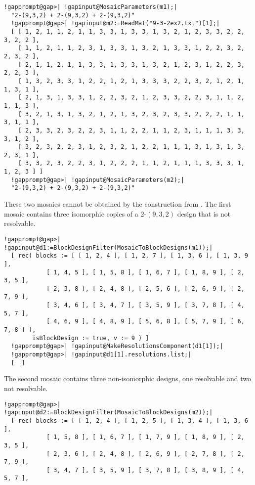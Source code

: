 \documentclass[a4paper,11pt]{report}
\begin{document}
{{\begin{Verbatim}[commandchars=!@|,fontsize=\small,frame=single,label=Example]
  !gapprompt@gap>| !gapinput@MosaicParameters(m1);|
  "2-(9,3,2) + 2-(9,3,2) + 2-(9,3,2)"
  !gapprompt@gap>| !gapinput@m2:=ReadMat("9-3-2ex2.txt")[1];|
  [ [ 1, 2, 1, 1, 2, 1, 1, 3, 3, 1, 3, 3, 1, 3, 2, 1, 2, 3, 3, 2, 2, 3, 2, 2 ], 
    [ 1, 1, 2, 1, 1, 2, 3, 1, 3, 3, 1, 3, 2, 1, 3, 3, 1, 2, 2, 3, 2, 2, 3, 2 ], 
    [ 2, 1, 1, 2, 1, 1, 3, 3, 1, 3, 3, 1, 3, 2, 1, 2, 3, 1, 2, 2, 3, 2, 2, 3 ], 
    [ 1, 3, 2, 3, 3, 1, 2, 2, 1, 2, 1, 3, 3, 3, 2, 2, 3, 2, 1, 2, 1, 1, 3, 1 ], 
    [ 2, 1, 3, 1, 3, 3, 1, 2, 2, 3, 2, 1, 2, 3, 3, 2, 2, 3, 1, 1, 2, 1, 1, 3 ], 
    [ 3, 2, 1, 3, 1, 3, 2, 1, 2, 1, 3, 2, 3, 2, 3, 3, 2, 2, 2, 1, 1, 3, 1, 1 ], 
    [ 2, 3, 3, 2, 3, 2, 2, 3, 1, 1, 2, 2, 1, 1, 2, 3, 1, 1, 1, 3, 3, 3, 1, 2 ], 
    [ 3, 2, 3, 2, 2, 3, 1, 2, 3, 2, 1, 2, 2, 1, 1, 1, 3, 1, 3, 1, 3, 2, 3, 1 ], 
    [ 3, 3, 2, 3, 2, 2, 3, 1, 2, 2, 2, 1, 1, 2, 1, 1, 1, 3, 3, 3, 1, 1, 2, 3 ] ]
  !gapprompt@gap>| !gapinput@MosaicParameters(m2);|
  "2-(9,3,2) + 2-(9,3,2) + 2-(9,3,2)"
\end{Verbatim}
 These two mosaics cannot be obtained by the construction from \cite{GGP18}. The first mosaic contains three isomorphic copies of a $2$-$(9,3,2)$ design that is not resolvable. 
\begin{Verbatim}[commandchars=!@|,fontsize=\small,frame=single,label=Example]
  !gapprompt@gap>| !gapinput@d1:=BlockDesignFilter(MosaicToBlockDesigns(m1));|
  [ rec( blocks := [ [ 1, 2, 4 ], [ 1, 2, 7 ], [ 1, 3, 6 ], [ 1, 3, 9 ], 
            [ 1, 4, 5 ], [ 1, 5, 8 ], [ 1, 6, 7 ], [ 1, 8, 9 ], [ 2, 3, 5 ], 
            [ 2, 3, 8 ], [ 2, 4, 8 ], [ 2, 5, 6 ], [ 2, 6, 9 ], [ 2, 7, 9 ], 
            [ 3, 4, 6 ], [ 3, 4, 7 ], [ 3, 5, 9 ], [ 3, 7, 8 ], [ 4, 5, 7 ], 
            [ 4, 6, 9 ], [ 4, 8, 9 ], [ 5, 6, 8 ], [ 5, 7, 9 ], [ 6, 7, 8 ] ], 
        isBlockDesign := true, v := 9 ) ]
  !gapprompt@gap>| !gapinput@MakeResolutionsComponent(d1[1]);|
  !gapprompt@gap>| !gapinput@d1[1].resolutions.list;|
  [  ]
\end{Verbatim}
 The second mosaic contains three non-isomorphic designs, one resolvable and
two not resolvable. 
\begin{Verbatim}[commandchars=!@|,fontsize=\small,frame=single,label=Example]
  !gapprompt@gap>| !gapinput@d2:=BlockDesignFilter(MosaicToBlockDesigns(m2));|
  [ rec( blocks := [ [ 1, 2, 4 ], [ 1, 2, 5 ], [ 1, 3, 4 ], [ 1, 3, 6 ], 
            [ 1, 5, 8 ], [ 1, 6, 7 ], [ 1, 7, 9 ], [ 1, 8, 9 ], [ 2, 3, 5 ], 
            [ 2, 3, 6 ], [ 2, 4, 8 ], [ 2, 6, 9 ], [ 2, 7, 8 ], [ 2, 7, 9 ], 
            [ 3, 4, 7 ], [ 3, 5, 9 ], [ 3, 7, 8 ], [ 3, 8, 9 ], [ 4, 5, 7 ], 

\end{Verbatim}}}
\end{document}
